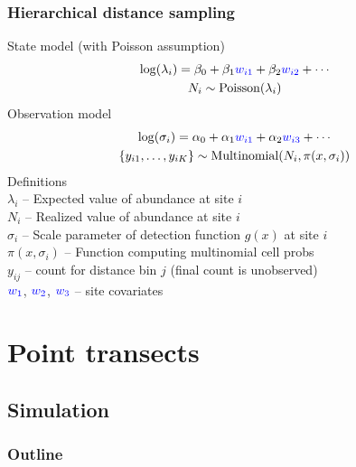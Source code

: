 \documentclass[color=usenames,dvipsnames]{beamer}\usepackage[]{graphicx}\usepackage[]{xcolor}
\begin{document}
\begin{frame}
  \frametitle{Hierarchical distance sampling}
  \small
  State model (with Poisson assumption)
  \begin{gather*}
    \mathrm{log}(\lambda_i) = \beta_0 + \beta_1 {\color{blue} w_{i1}} +
    \beta_2 {\color{blue} w_{i2}} + \cdots \\
    N_i \sim \mathrm{Poisson}(\lambda_i)
  \end{gather*}
  \pause
  Observation model
  \begin{gather*}
    \mathrm{log}(\sigma_{i}) = \alpha_0 + \alpha_1 {\color{blue} w_{i1}}
    + \alpha_2 {\color{blue} w_{i3}} + \cdots \\
    \{y_{i1}, \dots, y_{iK}\}  \sim \mathrm{Multinomial}(N_i,
    \pi(x, \sigma_i))
  \end{gather*}
  \pause
  \small
  Definitions \\
  $\lambda_i$ -- Expected value of abundance at site $i$ \\
  $N_i$ -- Realized value of abundance at site $i$ \\
  $\sigma_{i}$ -- Scale parameter of detection function $g(x)$ at site $i$ \\
  $\pi(x,\sigma_i)$ -- Function computing multinomial cell probs \\
  $y_{ij}$ -- count for distance bin $j$ (final count is unobserved) \\
  $\color{blue} w_1$, $\color{blue} w_2$, $\color{blue} w_3$ -- site covariates %
\end{frame}






\section{Point transects}

\subsection{Simulation}


\begin{frame}
  \frametitle{Outline}
  \Large
\end{frame}
\end{document}
